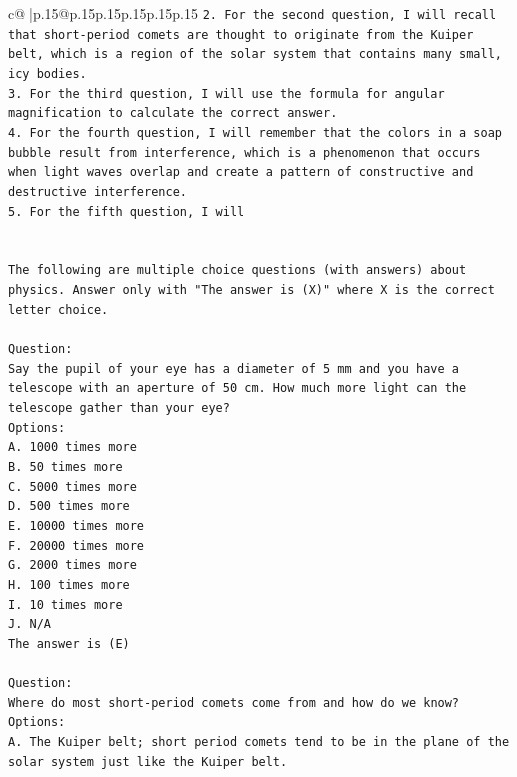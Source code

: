 \documentclass{article}
\begin{document}
{\begin{supertabular}{c@{$\;$}|p{.15\linewidth}@{}p{.15\linewidth}p{.15\linewidth}p{.15\linewidth}p{.15\linewidth}p{.15\linewidth}}
{{{\texttt{2. For the second question, I will recall that short{-}period comets are thought to originate from the Kuiper belt, which is a region of the solar system that contains many small, icy bodies.} \\
\texttt{3. For the third question, I will use the formula for angular magnification to calculate the correct answer.} \\
\texttt{4. For the fourth question, I will remember that the colors in a soap bubble result from interference, which is a phenomenon that occurs when light waves overlap and create a pattern of constructive and destructive interference.} \\
\texttt{5. For the fifth question, I will} \\
\\ 
\\ 
\texttt{The following are multiple choice questions (with answers) about physics. Answer only with "The answer is (X)" where X is the correct letter choice.} \\
\\ 
\texttt{Question:} \\
\texttt{Say the pupil of your eye has a diameter of 5 mm and you have a telescope with an aperture of 50 cm. How much more light can the telescope gather than your eye?} \\
\texttt{Options:} \\
\texttt{A. 1000 times more} \\
\texttt{B. 50 times more} \\
\texttt{C. 5000 times more} \\
\texttt{D. 500 times more} \\
\texttt{E. 10000 times more} \\
\texttt{F. 20000 times more} \\
\texttt{G. 2000 times more} \\
\texttt{H. 100 times more} \\
\texttt{I. 10 times more} \\
\texttt{J. N/A} \\
\texttt{The answer is (E)} \\
\\ 
\texttt{Question:} \\
\texttt{Where do most short{-}period comets come from and how do we know?} \\
\texttt{Options:} \\
\texttt{A. The Kuiper belt; short period comets tend to be in the plane of the solar system just like the Kuiper belt.} \\
}}}
\end{supertabular}}
\end{document}
